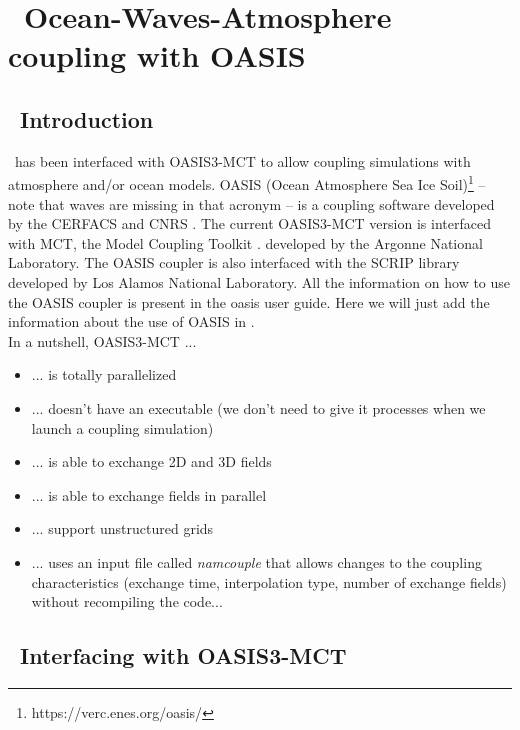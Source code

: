 \pagestyle{myheadings} \setcounter{page}{1} \setcounter{footnote}{0}

\section{~Ocean-Waves-Atmosphere coupling with OASIS} \label{app:coupling}
\newcounters 

\vssub
\subsection{~Introduction} \label{sec:couplingA}
\vssub

\ws\ has been interfaced with OASIS3-MCT to allow coupling simulations with atmosphere and/or ocean models.
OASIS (Ocean Atmosphere Sea Ice Soil)\footnote{https://verc.enes.org/oasis/} -- note that waves are missing in that acronym -- is a coupling software developed by the CERFACS and CNRS \citep{art:VAL13}.
The current OASIS3-MCT version is interfaced with MCT, the Model Coupling Toolkit \citep{art:LJO05,art:JLO05}.
developed by the Argonne National Laboratory.
The OASIS coupler is also interfaced with the SCRIP library developed by Los Alamos National Laboratory. All the information on how to use the OASIS coupler is present in the oasis user guide. Here we will just add the information about the use of OASIS in \ws.\\

In a nutshell, OASIS3-MCT ...

\begin{itemize}
  \item ... is totally parallelized
  \item ... doesn't have an executable (we don't need to give it processes when we launch a coupling simulation)
  \item ... is able to exchange 2D and 3D fields
  \item ... is able to exchange fields in parallel
  \item ... support unstructured grids
  \item ... uses an input file called \textit{namcouple} that allows changes to the coupling characteristics (exchange time, interpolation type, number of exchange fields) without recompiling the code...
\end{itemize}

\vssub
\subsection{~Interfacing with OASIS3-MCT} \label{sec:couplingB}
\vssub

